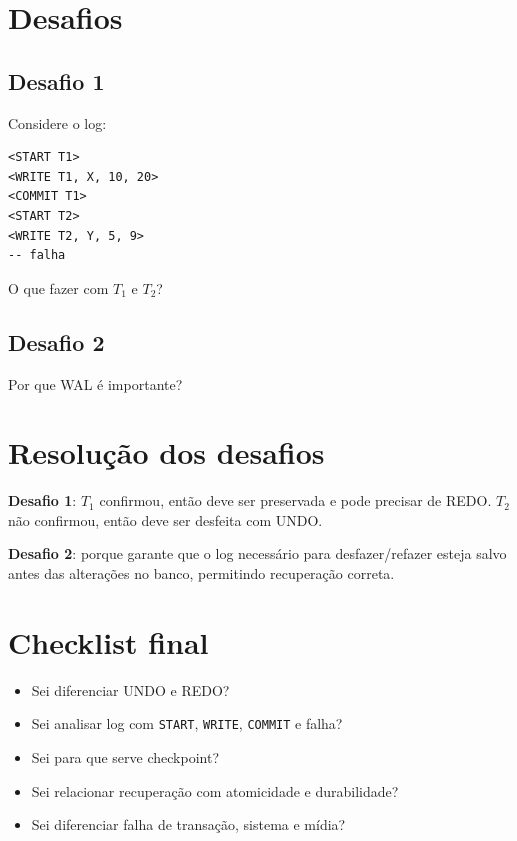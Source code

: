 \documentclass[12pt,a4paper]{article}
\begin{document}
\section{Desafios}
\subsection*{Desafio 1}
Considere o log:
\begin{verbatim}
<START T1>
<WRITE T1, X, 10, 20>
<COMMIT T1>
<START T2>
<WRITE T2, Y, 5, 9>
-- falha
\end{verbatim}
O que fazer com $T_1$ e $T_2$?

\subsection*{Desafio 2}
Por que WAL é importante?

\section{Resolução dos desafios}
\textbf{Desafio 1}: $T_1$ confirmou, então deve ser preservada e pode precisar de REDO. $T_2$ não confirmou, então deve ser desfeita com UNDO.

\textbf{Desafio 2}: porque garante que o log necessário para desfazer/refazer esteja salvo antes das alterações no banco, permitindo recuperação correta.

\section{Checklist final}
\begin{itemize}
    \item Sei diferenciar UNDO e REDO?
    \item Sei analisar log com \texttt{START}, \texttt{WRITE}, \texttt{COMMIT} e falha?
    \item Sei para que serve checkpoint?
    \item Sei relacionar recuperação com atomicidade e durabilidade?
    \item Sei diferenciar falha de transação, sistema e mídia?
\end{itemize}
\end{document}
